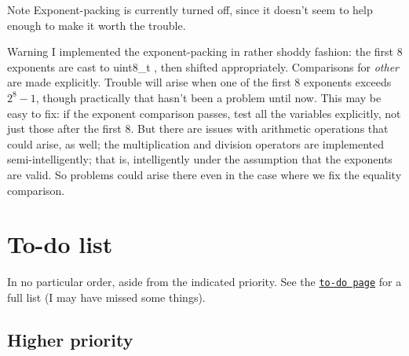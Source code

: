 \begin{DoxyNote}{Note}
Exponent-\/packing is currently turned off, since it doesn't seem to help enough to make it worth the trouble.
\end{DoxyNote}
\begin{DoxyWarning}{Warning}
I implemented the exponent-\/packing in rather shoddy fashion\+: the first 8 exponents are cast to {\ttfamily uint8\+\_\+t} , then shifted appropriately. Comparisons for {\itshape other} are made explicitly. Trouble will arise when one of the first 8 exponents exceeds $2^8-1$, though practically that hasn't been a problem until now. This may be easy to fix\+: if the exponent comparison passes, test all the variables explicitly, not just those after the first 8. But there are issues with arithmetic operations that could arise, as well; the multiplication and division operators are implemented semi-\/intelligently; that is, intelligently under the assumption that the exponents are valid. So problems could arise there even in the case where we fix the equality comparison.
\end{DoxyWarning}
\hypertarget{index_Todo}{}\section{To-\/do list}\label{index_Todo}
In no particular order, aside from the indicated priority. See the \href{todo.html}{\tt to-\/do page} for a full list (I may have missed some things).\hypertarget{index_hipri}{}\subsection{Higher priority}\label{index_hipri}
